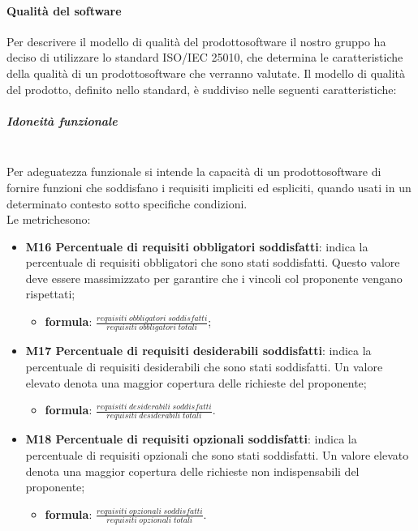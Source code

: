	\paragraph{Qualità del software} 
	Per descrivere il modello di qualità del prodotto\glosp software il nostro gruppo ha deciso di utilizzare lo standard ISO/IEC 25010, che determina le caratteristiche della qualità di un prodotto\glosp software che verranno valutate. Il modello di qualità del prodotto\glo, definito nello standard, è suddiviso nelle seguenti caratteristiche:
		\subparagraph{Idoneità funzionale} \mbox{}\\[1mm]
		Per adeguatezza funzionale si intende la capacità di un prodotto\glosp software di fornire funzioni che soddisfano i requisiti impliciti ed espliciti, quando usati in un determinato contesto sotto specifiche condizioni. \\
		Le metriche\glosp sono:
		\begin{itemize}
			\item \textbf{M16 Percentuale di requisiti obbligatori soddisfatti}: indica la percentuale di requisiti obbligatori che sono stati soddisfatti. Questo valore deve essere massimizzato per garantire che i vincoli col proponente vengano rispettati;
			\begin{itemize}
				\item[] \textbf{formula}: $\frac{requisiti \; obbligatori \; soddisfatti}{requisiti \; obbligatori \; totali}$;
			\end{itemize} 
			\item \textbf{M17 Percentuale di requisiti desiderabili soddisfatti}:
			indica la percentuale di requisiti desiderabili che sono stati soddisfatti. Un valore elevato denota una maggior copertura delle richieste del proponente;
			\begin{itemize}
				\item[] \textbf{formula}: $\frac{requisiti \; desiderabili \; soddisfatti}{requisiti \; desiderabili \; totali}$.
			\end{itemize} 
			\item \textbf{M18 Percentuale di requisiti opzionali soddisfatti}:
			indica la percentuale di requisiti opzionali che sono stati soddisfatti. Un valore elevato denota una maggior copertura delle richieste non indispensabili  del proponente;
			\begin{itemize}
				\item[] \textbf{formula}: $\frac{requisiti \; opzionali \; soddisfatti}{requisiti \; opzionali \; totali}$.
			\end{itemize} 
		\end{itemize}
	
